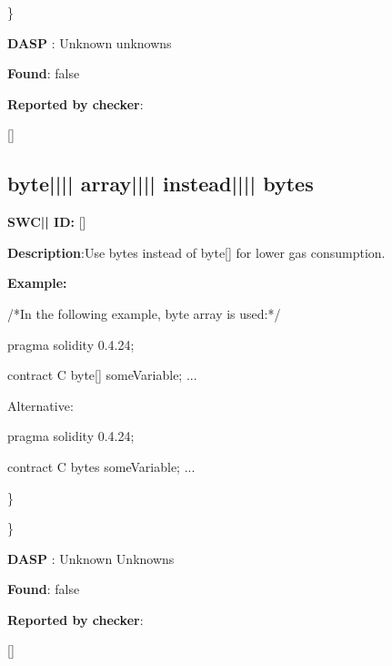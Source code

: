 \documentclass{article}
\begin{document}
\} 

\textbf{DASP} : Unknown unknowns

\textbf{Found}: false

\textbf{Reported by checker}: 
\begin{ffcode} 

[]
\end{ffcode} 
\subsection{byte{||\textunderscore|| }array{||\textunderscore|| }instead{||\textunderscore|| }bytes} 
\textbf{SWC{|\textunderscore| }ID:} []

\textbf{Description}:Use bytes instead of byte[] for lower gas consumption.


\textbf{Example:} 
\begin{ffcode} 

/*In the following example, byte array is used:*/ 

pragma solidity 0.4.24;

contract C {
    byte[] someVariable;
    ...
}

Alternative:

pragma solidity 0.4.24;

contract C {
    bytes someVariable;
    ...
}

\end{ffcode} 
\} 

\} 

\textbf{DASP} : Unknown Unknowns

\textbf{Found}: false

\textbf{Reported by checker}: 
\begin{ffcode} 

[]
\end{ffcode} 
\end{document}
